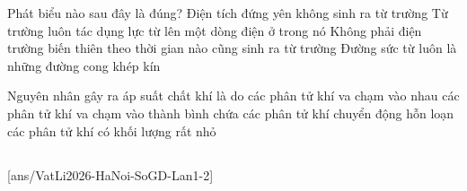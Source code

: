 	\begin{ex}%
		Phát biểu nào sau đây là đúng?
		\choice
		{\True Điện tích đứng yên không sinh ra từ trường}
		{Từ trường luôn tác dụng lực từ lên một dòng điện ở trong nó}
		{Không phải điện trường biến thiên theo thời gian nào cũng sinh ra từ trường}
		{Đường sức từ luôn là những đường cong khép kín}
	\end{ex}

	\begin{ex}%
		Nguyên nhân gây ra áp suất chất khí là do
		\choice
		{các phân tử khí va chạm vào nhau}
		{\True các phân tử khí va chạm vào thành bình chứa}
		{các phân tử khí chuyển động hỗn loạn}
		{các phân tử khí có khối lượng rất nhỏ}
	\end{ex}

	\subsection*{}
	\setcounter{ex}{0}
	[ans/VatLi2026-HaNoi-SoGD-Lan1-2]

